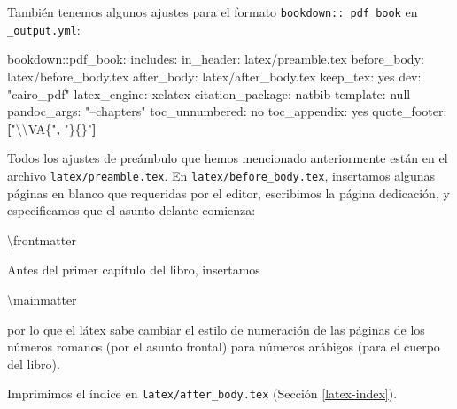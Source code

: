\documentclass[12pt,]{krantz}
\makeatletter
\newenvironment{Shaded}{\begin{snugshade}}{\end{snugshade}}
\newcommand{\KeywordTok}[1]{\textcolor[rgb]{0.13,0.29,0.53}{\textbf{{#1}}}}
\newcommand{\DataTypeTok}[1]{\textcolor[rgb]{0.13,0.29,0.53}{{#1}}}
\newcommand{\StringTok}[1]{\textcolor[rgb]{0.31,0.60,0.02}{{#1}}}
\newcommand{\FunctionTok}[1]{\textcolor[rgb]{0.00,0.00,0.00}{{#1}}}
\newcommand{\NormalTok}[1]{{#1}}
\newenvironment{kframe}{%
\medskip{}
\setlength{\fboxsep}{.8em}
 \def\at@end@of@kframe{}%
 \ifinner\ifhmode%
  \def\at@end@of@kframe{\end{minipage}}%
  \begin{minipage}{\columnwidth}%
 \fi\fi%
 \def\FrameCommand##1{\hskip\@totalleftmargin \hskip-\fboxsep
 \colorbox{shadecolor}{##1}\hskip-\fboxsep
     \hskip-\linewidth \hskip-\@totalleftmargin \hskip\columnwidth}%
 \MakeFramed {\advance\hsize-\width
   \@totalleftmargin\z@ \linewidth\hsize
   \@setminipage}}%
 {\par\unskip\endMakeFramed%
 \at@end@of@kframe}
\renewenvironment{Shaded}{\begin{kframe}}{\end{kframe}}
\theoremstyle{definition}
\theoremstyle{definition}
\theoremstyle{remark}
\makeatother
\begin{document}
También tenemos algunos ajustes para el formato
\texttt{bookdown::\ pdf\_book} en
\texttt{\_output.yml}:

\begin{Shaded}
\begin{Highlighting}[]
\FunctionTok{bookdown:}\NormalTok{:pdf_book:}
  \FunctionTok{includes:}
    \FunctionTok{in_header:} \NormalTok{latex/preamble.tex}
    \FunctionTok{before_body:} \NormalTok{latex/before_body.tex}
    \FunctionTok{after_body:} \NormalTok{latex/after_body.tex}
  \FunctionTok{keep_tex:} \NormalTok{yes}
  \FunctionTok{dev:} \StringTok{"cairo_pdf"}
  \FunctionTok{latex_engine:} \NormalTok{xelatex}
  \FunctionTok{citation_package:} \NormalTok{natbib}
  \FunctionTok{template:} \DataTypeTok{null}
  \FunctionTok{pandoc_args:} \StringTok{"--chapters"}
  \FunctionTok{toc_unnumbered:} \NormalTok{no}
  \FunctionTok{toc_appendix:} \NormalTok{yes}
  \FunctionTok{quote_footer:} \KeywordTok{[}\StringTok{"\textbackslash{}\textbackslash{}VA\{"}\KeywordTok{,} \StringTok{"\}\{\}"}\KeywordTok{]}
\end{Highlighting}
\end{Shaded}

Todos los ajustes de preámbulo que hemos mencionado anteriormente están
en el archivo \texttt{latex/preamble.tex}. En
\texttt{latex/before\_body.tex}, insertamos algunas páginas en blanco
que requeridas por el editor, escribimos la página dedicación, y
especificamos que el asunto delante comienza:

\begin{Shaded}
\begin{Highlighting}[]
\NormalTok{\textbackslash{}frontmatter}
\end{Highlighting}
\end{Shaded}

Antes del primer capítulo del libro, insertamos

\begin{Shaded}
\begin{Highlighting}[]
\NormalTok{\textbackslash{}mainmatter}
\end{Highlighting}
\end{Shaded}

por lo que el látex sabe cambiar el estilo de numeración de las páginas
de los números romanos (por el asunto frontal) para números arábigos
(para el cuerpo del libro).

Imprimimos el índice en \texttt{latex/after\_body.tex} (Sección
\ref{latex-index}).
\end{document}
